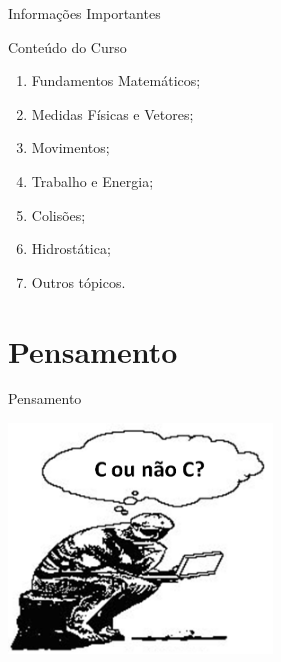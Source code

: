 \documentclass[xcolor=dvipsnames,table]{beamer}
\begin{document}
	\begin{frame}{Informações Importantes}
		\begin{block}{Conteúdo do Curso}
			\begin{enumerate}
				\item Fundamentos Matemáticos;
				\item Medidas Físicas e Vetores;
				\item Movimentos;
				\item Trabalho e Energia;
				\item Colisões;
				\item Hidrostática;
				\item Outros tópicos.
			\end{enumerate}
		\end{block}
	\end{frame}

	\section{Pensamento}
	\begin{frame}{Pensamento}
  		\begin{center}
    		\includegraphics[width=7cm]{images/pensamento.png}
  		\end{center}
	\end{frame}
	
\end{document}
